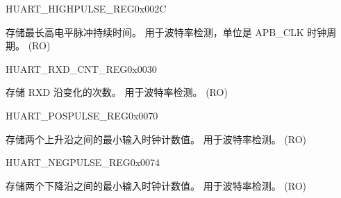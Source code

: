 \begin{register}{H}{UART\_HIGHPULSE\_REG}{0x002C}\label{regdesc:UARTHIGHPULSEREG}
%
%
\regnewline%
\begin{regdesc}\begin{reglist}
\label{fielddesc:UARTHIGHPULSEMINCNT}\item [UART\_HIGHPULSE\_MIN\_CNT] 存储最长高电平脉冲持续时间。 用于波特率检测，单位是 APB\_CLK 时钟周期。 (RO)
\end{reglist}\end{regdesc}
\end{register}


\begin{register}{H}{UART\_RXD\_CNT\_REG}{0x0030}\label{regdesc:UARTRXDCNTREG}
%
%
\regnewline%
\begin{regdesc}\begin{reglist}
\label{fielddesc:UARTRXDEDGECNT}\item [UART\_RXD\_EDGE\_CNT] 存储 RXD 沿变化的次数。 用于波特率检测。 (RO)
\end{reglist}\end{regdesc}
\end{register}


\begin{register}{H}{UART\_POSPULSE\_REG}{0x0070}\label{regdesc:UARTPOSPULSEREG}
%
%
\regnewline%
\begin{regdesc}\begin{reglist}
\label{fielddesc:UARTPOSEDGEMINCNT}\item [UART\_POSEDGE\_MIN\_CNT] 存储两个上升沿之间的最小输入时钟计数值。 用于波特率检测。 (RO)
\end{reglist}\end{regdesc}
\end{register}


\begin{register}{H}{UART\_NEGPULSE\_REG}{0x0074}\label{regdesc:UARTNEGPULSEREG}
%
%
\regnewline%
\begin{regdesc}\begin{reglist}
\label{fielddesc:UARTNEGEDGEMINCNT}\item [UART\_NEGEDGE\_MIN\_CNT] 存储两个下降沿之间的最小输入时钟计数值。 用于波特率检测。 (RO)
\end{reglist}\end{regdesc}
\end{register}


